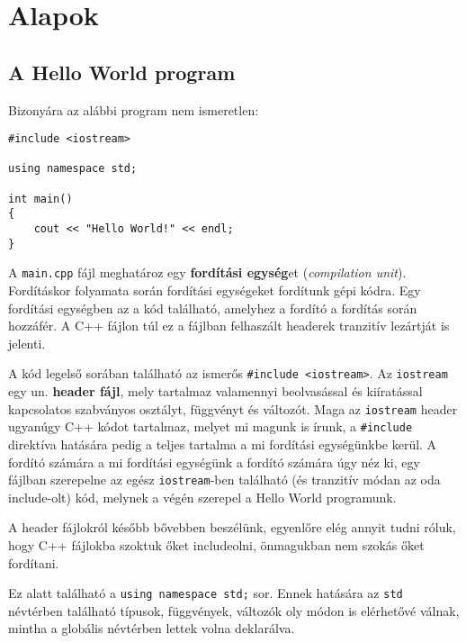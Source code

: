 \documentclass[../cpp_book/cpp_book.tex]{subfiles}
\begin{document}
	\section{Alapok}

	\subsection{A Hello World program}
	Bizonyára az alábbi program nem ismeretlen:
	
	\medskip
	
	\begin{lstlisting}
#include <iostream>

using namespace std;
	
int main()
{
	cout << "Hello World!" << endl;
}
	\end{lstlisting}
	A \texttt{main.cpp} fájl meghatároz egy \textbf{fordítási egység}et (\textit{compilation unit}). Fordításkor folyamata során fordítási egységeket fordítunk gépi kódra. Egy fordítási egységben az a kód található, amelyhez a fordító a fordítás során hozzáfér. A C++ fájlon túl ez a fájlban felhaszált headerek tranzitív lezártját is jelenti.
	
	\medskip
	A kód legelső sorában található az ismerős \texttt{\#include <iostream>}. Az \texttt{iostream} egy un. \textbf{header fájl}, mely tartalmaz valamennyi beolvasással és kiíratással kapcsolatos szabványos osztályt, függvényt és változót. Maga az \texttt{iostream} header ugyanúgy C++ kódot tartalmaz, melyet mi magunk is írunk, a \texttt{\#include} direktíva hatására pedig a teljes tartalma a mi fordítási egységünkbe kerül. A fordító számára a mi fordítási egységünk a fordító számára úgy néz ki, egy fájlban szerepelne az egész \texttt{iostream}-ben található (és tranzitív módan az oda include-olt) kód, melynek a végén szerepel a Hello World programunk.
	
	A header fájlokról később bővebben beszélünk, egyenlőre elég annyit tudni róluk, hogy C++ fájlokba szoktuk őket includeolni, önmagukban nem szokás őket fordítani.
	
	\medskip
	Ez alatt található a \texttt{using namespace std;} sor. Ennek hatására az \texttt{std} névtérben található típusok, függvények, változók oly módon is elérhetővé válnak, mintha a globális névtérben lettek volna deklarálva. 
	
\end{document}
